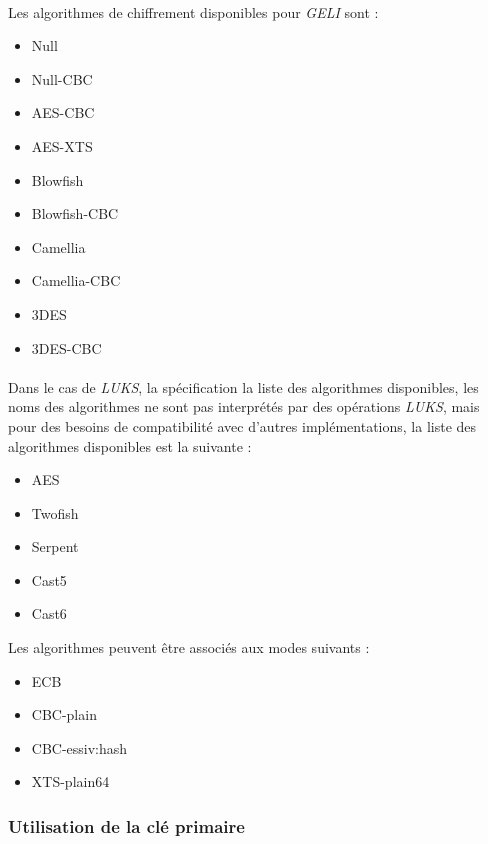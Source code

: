 \paragraph{}
Les algorithmes de chiffrement disponibles pour {\em GELI} \cite{geli.h} sont :
\begin{itemize}
	\item Null
	\item Null-CBC
	\item AES-CBC
	\item AES-XTS
	\item Blowfish
	\item Blowfish-CBC
	\item Camellia
	\item Camellia-CBC
	\item 3DES
	\item 3DES-CBC
\end{itemize}

\paragraph{}
Dans le cas de {\em LUKS}, la spécification \cite{onDiskFormatLuks}
la liste des algorithmes disponibles, les noms des algorithmes ne sont pas 
interprétés par des opérations {\em LUKS}, mais pour des besoins de 
compatibilité avec d'autres implémentations, la liste des algorithmes 
disponibles est la suivante :
\begin{itemize}
	\item AES
	\item Twofish
	\item Serpent
	\item Cast5
	\item Cast6
\end{itemize}
Les algorithmes peuvent être associés aux modes suivants :
\begin{itemize}
	\item ECB
	\item CBC-plain
	\item CBC-essiv:hash
	\item XTS-plain64
\end{itemize}

\subsubsection{Utilisation de la clé primaire}
